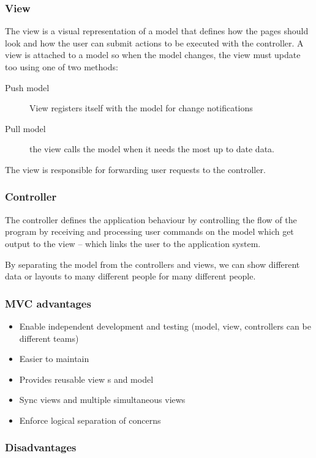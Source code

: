 \subsubsection{View}\label{ssub:view}

The view is a visual representation of a model that defines how the pages should look and how the user can submit actions to be executed with the controller.
A view is attached to a model so when the model changes, the view must update too using one of two methods:
\begin{description}
	\item[Push model] View registers itself with the model for change notifications
	\item[Pull model] the view calls the model when it needs the most up to date data.
\end{description}
The view is responsible for forwarding user requests to the controller.

\subsubsection{Controller}\label{ssub:controller}

The controller defines the application behaviour by controlling the flow of the program by receiving and processing user commands on the model which get output to the view -- which links the user to the application system.

By separating the model from the controllers and views, we can show different data or layouts to many different people for many different people.

\subsubsection{MVC advantages}\label{ssub:mvc_advantages}

\begin{itemize}
	\item Enable independent development and testing (model, view, controllers can be different teams)
	\item Easier to maintain
	\item Provides reusable view s and model
	\item Sync views and multiple simultaneous views
	\item Enforce logical separation of concerns
\end{itemize}

\subsubsection{Disadvantages}\label{ssub:disadvantages}

